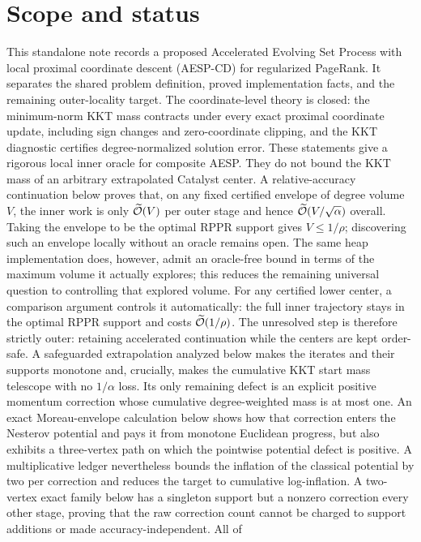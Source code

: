 \section{Scope and status}

This standalone note records a proposed Accelerated Evolving Set Process with
local proximal coordinate descent (AESP-CD) for regularized PageRank.  It
separates the shared problem definition, proved implementation facts, and the
remaining outer-locality target.  The coordinate-level theory is closed: the
minimum-norm KKT mass contracts under every exact proximal coordinate update,
including sign changes and zero-coordinate clipping, and the KKT diagnostic
certifies degree-normalized solution error.  These statements give a rigorous
local inner oracle for composite AESP.  They do not bound the KKT mass of an
arbitrary extrapolated Catalyst center.  A relative-accuracy continuation
below proves that, on any fixed certified envelope of degree volume $V$, the
inner work is only $\widetilde{\mathcal{O}}(V)$ per outer stage and hence
$\widetilde{\mathcal{O}}(V/\sqrt\alpha)$ overall.  Taking the envelope to be the optimal RPPR
support gives $V\leq1/\rho$; discovering such an envelope locally without an
oracle remains open.  The same heap implementation does, however, admit an
oracle-free bound in terms of the maximum volume it actually explores; this
reduces the remaining universal question to controlling that explored volume.
For any certified lower center, a comparison argument controls it
automatically: the full inner trajectory stays in the optimal RPPR support
and costs $\widetilde{\mathcal{O}}(1/\rho)$.  The unresolved step is therefore strictly outer:
retaining accelerated continuation while the centers are kept order-safe.  A
safeguarded extrapolation analyzed below makes the iterates and their supports
monotone and, crucially, makes the cumulative KKT start mass telescope with no
$1/\alpha$ loss.  Its only remaining defect is an explicit positive momentum
correction whose cumulative degree-weighted mass is at most one.  An exact
Moreau-envelope calculation below shows how that correction enters the
Nesterov potential and pays it from monotone Euclidean progress, but also
exhibits a three-vertex path on which the pointwise potential defect is
positive.  A multiplicative ledger nevertheless bounds the inflation of the
classical potential by two per correction and reduces the target to cumulative
log-inflation.  A two-vertex exact family below has a singleton support but a
nonzero correction every other stage, proving that the raw correction count
cannot be charged to support additions or made accuracy-independent.  All of
